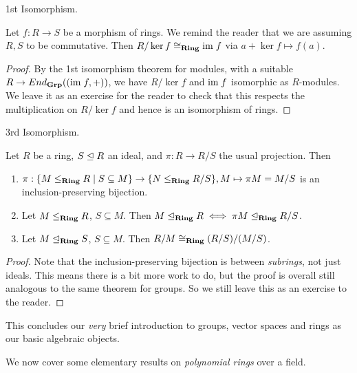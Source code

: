 \documentclass[../book.tex]{subfiles}
\begin{document}
\begin{thm} 1st Isomorphism.
    
    Let $f : R \to S$ be a morphism of rings. 
    We remind the reader that we are assuming $R, S$ to be commutative. 
    Then $R/\ker f \cong_{\mathbf{Ring}} \textnormal{im}\; f$ via $a + \ker f \mapsto f(a)$. 
\end{thm}
\begin{proof}
    By the 1st isomorphism theorem for modules, 
    with a suitable $R \to End_{\mathbf{Grp}}((\textnormal{im}\; f, +))$,
    we have $R/\ker f$ and $\textnormal{im}\; f$ isomorphic as $R$-modules. 
    We leave it as an exercise for the reader to check that
    this respects the multiplication on $R/\ker f$ and
    hence is an isomorphism of rings.
\end{proof}
\begin{thm} 3rd Isomorphism.

    Let $R$ be a ring, $S \trianglelefteq R$ an ideal, and
    $\pi : R \to R/S$ the usual projection. 
    Then
    \begin{enumerate}
        \item $\pi : 
        \{M \leq_{\mathbf{Ring}} R \mid S \subseteq M\} \to \{N \leq_{\mathbf{Ring}} R/S\}, 
        M \mapsto \pi M = M/S$ is an inclusion-preserving bijection.
        \item Let $M \leq_{\mathbf{Ring}} R$, $S \subseteq M$. 
        Then $M \trianglelefteq_{\mathbf{Ring}} R \iff \pi M \trianglelefteq_{\mathbf{Ring}} R/S$.
        \item Let $M \trianglelefteq_{\mathbf{Ring}} S$, $S \subseteq M$. 
        Then $R / M \cong_{\mathbf{Ring}} (R / S) / (M / S)$. 
    \end{enumerate}
\end{thm}
\begin{proof}
    Note that the inclusion-preserving bijection is between \emph{subrings},
    not just ideals. 
    This means there is a bit more work to do, 
    but the proof is overall still analogous to the same theorem for groups.
    So we still leave this as an exercise to the reader. 
\end{proof}

\begin{rmk}
    This concludes our \emph{very} brief introduction to 
    groups, vector spaces and rings as our basic algebraic objects. 
    
    We now cover some elementary results on \emph{polynomial rings} over a field.
\end{rmk}

\end{document}
